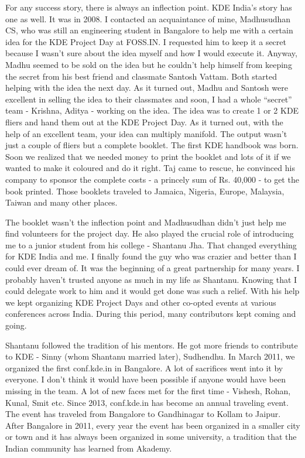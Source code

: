 For any success story, there is always an inflection point. KDE India's story has one as well. It was in 2008. I contacted an acquaintance of mine, Madhusudhan CS, who was still an engineering student in Bangalore to help me with a certain idea for the KDE Project Day at FOSS.IN. I requested him to keep it a secret because I wasn't sure about the idea myself and how I would execute it. Anyway, Madhu seemed to be sold on the idea but he couldn't help himself from keeping the secret from his best friend and classmate Santosh Vattam. Both started helping with the idea the next day. As it turned out, Madhu and Santosh were excellent in selling the idea to their classmates and soon, I had a whole “secret” team - Krishna, Aditya - working on the idea. The idea was to create 1 or 2 KDE fliers and hand them out at the KDE Project Day. As it turned out, with the help of an excellent team, your idea can multiply manifold. The output wasn't just a couple of fliers but a complete booklet. The first KDE handbook was born. Soon we realized that we needed money to print the booklet and lots of it if we wanted to make it coloured and do it right. Taj came to rescue, he convinced his company to sponsor the complete costs - a princely sum of Rs. 40,000 - to get the book printed. Those booklets traveled to Jamaica, Nigeria, Europe, Malaysia, Taiwan and many other places.

The booklet wasn't the inflection point and Madhusudhan didn't just help me find volunteers for the project day. He also played the crucial role of introducing me to a junior student from his college - Shantanu Jha. That changed everything for KDE India and me. I finally found the guy who was crazier and better than I could ever dream of. It was the beginning of a great partnership for many years. I probably haven't trusted anyone as much in my life as Shantanu. Knowing that I could delegate work to him and it would get done was such a relief. With his help we kept organizing KDE Project Days and other co-opted events at various conferences across India. During this period, many contributors kept coming and going.

Shantanu followed the tradition of his mentors. He got more friends to contribute to KDE - Sinny (whom Shantanu married later), Sudhendhu. In March 2011, we organized the first conf.kde.in in Bangalore. A lot of sacrifices went into it by everyone. I don't think it would have been possible if anyone would have been missing in the team. A lot of new faces met for the first time - Vishesh, Rohan, Kunal, Smit etc. Since 2013, conf.kde.in has become an annual traveling event. The event has traveled from Bangalore to Gandhinagar to Kollam to Jaipur. After Bangalore in 2011, every year the event has been organized in a smaller city or town and it has always been organized in some university, a tradition that the Indian community has learned from Akademy.

